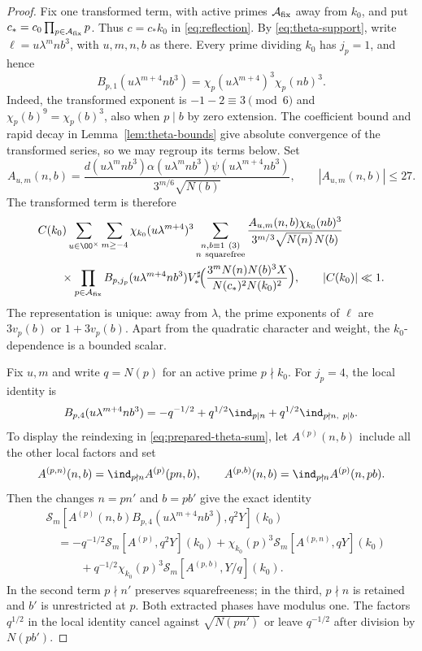 \begin{proof}
Fix one transformed term, with active primes $\mathcal A_{\rm fix}$
away from $k_0$, and put $c_*=c_0\prod_{p\in\mathcal A_{\rm fix}}p$.
Thus $c=c_*k_0$ in \eqref{eq:reflection}.
By \eqref{eq:theta-support}, write $\ell=u\lambda^mnb^3$,
with $u,m,n,b$ as there.
Every prime dividing $k_0$ has $j_p=1$, and hence
\begin{equation}\label{eq:residual-quadratic-factor}
 B_{p,1}(u\lambda^{m+4}nb^3)
 =\chi_p(u\lambda^{m+4})^3\chi_p(nb)^3.
\end{equation}
Indeed, the transformed exponent is $-1-2\equiv3\pmod6$ and
$\chi_p(b)^9=\chi_p(b)^3$, also when $p\mid b$ by zero extension.
The coefficient bound and rapid decay in Lemma~\ref{lem:theta-bounds}
give absolute convergence of the transformed series, so we may regroup
its terms below. Set
\[
 A_{u,m}(n,b)=
 \frac{d(u\lambda^mnb^3)\alpha(u\lambda^mnb^3)
       \psi(u\lambda^{m+4}nb^3)}{3^{m/6}\sqrt{N(b)}},
 \qquad |A_{u,m}(n,b)|\le27.
\]
The transformed term is therefore
\[
 \begin{aligned}
 &C(k_0)\sum_{u\in\OO^\times}\sum_{m\ge-4}
 \chi_{k_0}(u\lambda^{m+4})^3
 \sum_{\substack{n,b\equiv1\ (3)\\n\ {\rm squarefree}}}
 \frac{A_{u,m}(n,b)\chi_{k_0}(nb)^3}
      {3^{m/3}\sqrt{N(n)}\,N(b)}\\
 &\qquad\times\prod_{p\in\mathcal A_{\rm fix}}
 B_{p,j_p}(u\lambda^{m+4}nb^3)
 V_*^\sharp\!\Bigl(\frac{3^mN(n)N(b)^3X}
 {N(c_*)^2N(k_0)^2}\Bigr),\qquad |C(k_0)|\ll1.
 \end{aligned}
\]
The representation is unique: away from $\lambda$, the prime
exponents of $\ell$ are $3v_p(b)$ or $1+3v_p(b)$. Apart from the
quadratic character and weight, the $k_0$-dependence is a bounded scalar.

Fix $u,m$ and write $q=N(p)$ for an active prime $p\nmid k_0$.
For $j_p=4$, the local identity is
\[
 B_{p,4}(u\lambda^{m+4}nb^3)
 =-q^{-1/2}+q^{1/2}\ind_{p\mid n}
              +q^{1/2}\ind_{p\nmid n,\ p\mid b}.
\]
To display the reindexing in \eqref{eq:prepared-theta-sum}, let
$A^{(p)}(n,b)$ include all the other local factors and set
\[
 A^{(p,n)}(n,b)=\ind_{p\nmid n}A^{(p)}(pn,b),\qquad
 A^{(p,b)}(n,b)=\ind_{p\nmid n}A^{(p)}(n,pb).
\]
Then the changes $n=pn'$ and $b=pb'$ give the exact identity
\[
 \begin{aligned}
 &\mathscr S_m[A^{(p)}(n,b)B_{p,4}(u\lambda^{m+4}nb^3),q^2Y](k_0)\\
 &\quad=-q^{-1/2}\mathscr S_m[A^{(p)},q^2Y](k_0)
 +\chi_{k_0}(p)^3\mathscr S_m[A^{(p,n)},qY](k_0)\\
 &\qquad\quad+q^{-1/2}\chi_{k_0}(p)^3
              \mathscr S_m[A^{(p,b)},Y/q](k_0).
 \end{aligned}
\]
In the second term $p\nmid n'$ preserves squarefreeness; in the
third, $p\nmid n$ is retained and $b'$ is unrestricted at $p$.
Both extracted phases have modulus one. The factors $q^{1/2}$
in the local identity cancel against $\sqrt{N(pn')}$ or leave
$q^{-1/2}$ after division by $N(pb')$.


\end{proof}
